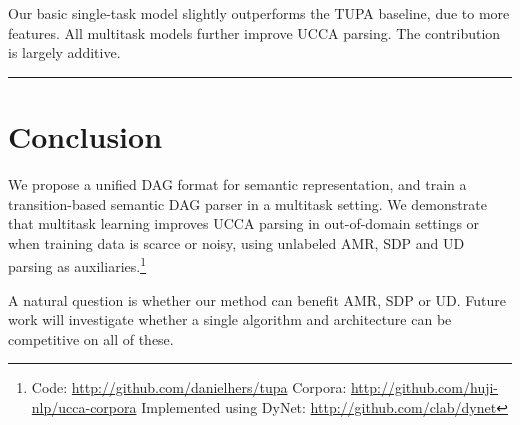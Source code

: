 \documentclass[a0,portrait]{a0poster}
\begin{document}
\begin{multicols}{2}
Our basic single-task model slightly outperforms the TUPA baseline, due to more features.
All multitask models further improve UCCA parsing. The contribution is largely additive.

\hrule


\section*{Conclusion}

We propose a unified DAG format for semantic representation,
and train a transition-based semantic DAG parser in a multitask setting.
We demonstrate that multitask learning improves UCCA parsing in out-of-domain settings
or when training data is scarce or noisy,
using unlabeled AMR, SDP and UD parsing as auxiliaries.\footnote{Code:
\url{http://github.com/danielhers/tupa} \hfill
Corpora: \url{http://github.com/huji-nlp/ucca-corpora} \hfill
Implemented using DyNet: \url{http://github.com/clab/dynet}}

A natural question is whether our method can benefit AMR, SDP or UD.
Future work will investigate whether a single
algorithm and architecture can be competitive on all of these.
\vspace{-5mm}


\end{multicols}
\end{document}
